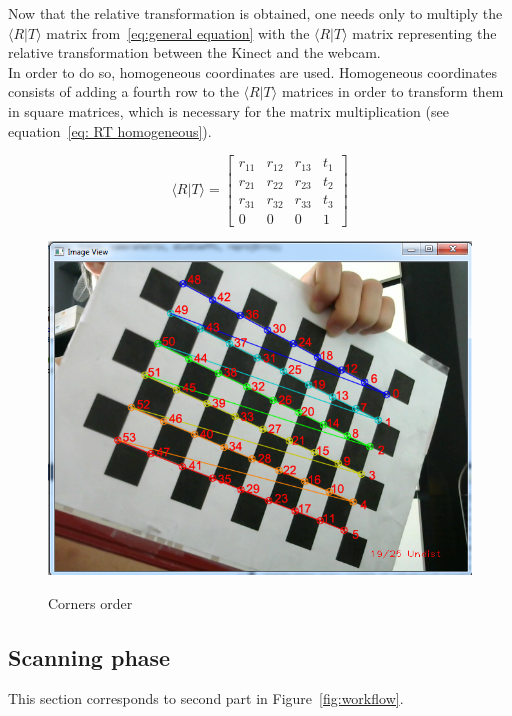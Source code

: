Now that the relative transformation is obtained, one needs only to multiply the $\langle R\vert T\rangle$ matrix from~\ref{eq:general equation} with the $\langle R\vert T\rangle$ matrix representing the relative transformation between the Kinect and the webcam.\\

In order to do so, homogeneous coordinates are used. Homogeneous coordinates consists of adding a fourth row to the $\langle R\vert T\rangle$ matrices in order to transform them in square matrices, which is necessary for the matrix multiplication (see equation~\ref{eq: RT homogeneous}).

\begin{equation}
\label{eq: RT homogeneous}
  \langle R\vert T\rangle =  \begin{bmatrix}
       r_{11} & r_{12} & r_{13} & t_1 \\
       r_{21} & r_{22} & r_{23} & t_2 \\
       r_{31} & r_{32} & r_{33} & t_3 \\
       0 & 0 & 0 & 1
     \end{bmatrix}
\end{equation}

\begin{figure}[H]
\caption{Corners order}
\centering
    \includegraphics[width=1.0\textwidth]{images/cornersOrder.png}
\label{fig:corners order}
\end{figure}

\subsection{Scanning phase} 
\label{sec:Scanning phase}
This section corresponds to second part in Figure~\ref{fig:workflow}.\\

